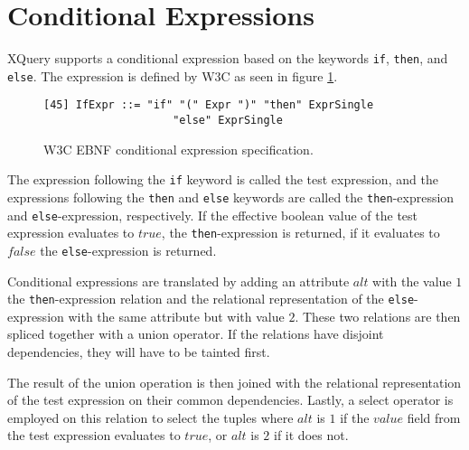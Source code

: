 \section{Conditional Expressions}
\label{sect:trans:TD:ifThenElse}
XQuery supports a conditional expression based on the keywords \texttt{if}, \texttt{then}, and \texttt{else}. The
expression is defined by W3C as seen in figure \ref{fig:trans:TD:condEBNF}.

\begin{figure}[h]
\begin{Verbatim}
[45] IfExpr ::= "if" "(" Expr ")" "then" ExprSingle 
                    "else" ExprSingle
\end{Verbatim}
\label{fig:trans:TD:condEBNF}
\caption{W3C EBNF conditional expression specification\cite{w3c00}.}
\end{figure}

The expression following the \texttt{if} keyword is called the test expression, and the expressions following the
\texttt{then} and \texttt{else} keywords are called the \texttt{then}-expression and \texttt{else}-expression,
respectively. If the effective boolean value of the test expression evaluates to $true$, the
\texttt{then}-expression is returned, if it evaluates to $false$ the \texttt{else}-expression is returned.

Conditional expressions are translated by adding an attribute $alt$ with the value $1$ the
\texttt{then}-expression relation and the relational representation of the \texttt{else}-expression with the same
attribute but with value $2$. These two relations are then spliced together with a \textsf{union} operator. If the
relations have disjoint dependencies, they will have to be tainted first.

The result of the \textsf{union} operation is then joined with the relational representation of the test
expression on their common dependencies. Lastly, a \textsf{select} operator is employed on this relation to select
the tuples where $alt$ is $1$ if the $value$ field from the test expression evaluates to $true$, or $alt$ is $2$
if it does not.

